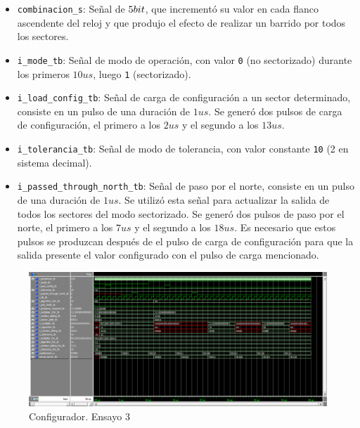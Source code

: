 \begin{itemize}
\begin{itemize}
	\item 
	\texttt{combinacion\_s}: Señal de $5\-bit$, que incrementó su valor en cada flanco ascendente del reloj y que produjo el efecto de realizar un barrido por todos los sectores.
	
    
    \item
    \texttt{i\_mode\_tb}: Señal de modo de operación, con valor \texttt{0} (no sectorizado) durante los primeros $10 us$, luego \texttt{1} (sectorizado).
    
    \item
    \texttt{i\_load\_config\_tb}: Señal de carga de configuración a un sector determinado, consiste en un pulso de una duración de $1 us$. Se generó dos pulsos de carga de configuración, el primero a los $2 us$ y el segundo a los $13 us$.
    
    \item
    \texttt{i\_tolerancia\_tb}: Señal de modo de tolerancia, con valor constante \texttt{10} (2 en sistema decimal).
    
    \item
    \texttt{i\_passed\_through\_north\_tb}: Señal de paso por el norte, consiste en un pulso de una duración de $1 us$. Se utilizó esta señal para actualizar la salida de todos los sectores del modo sectorizado. Se generó dos pulsos de paso por el norte, el primero a los $7 us$ y el segundo a los $18 us$. Es necesario que estos pulsos se produzcan después de  el pulso de carga de configuración para que la salida presente el valor configurado con el pulso de carga mencionado.
	\end{itemize}

\end{itemize}



\begin{figure}
\centering
\includegraphics[scale=0.52, angle=270]{./Figures/configurador_ensayo_3.png}
\caption{Configurador. Ensayo 3}
\label{fig:configurador_ensayo_3}
\end{figure}


